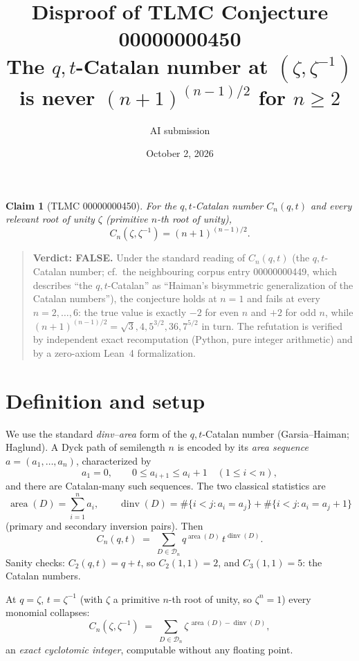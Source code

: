 \documentclass[11pt]{article}
\title{Disproof of TLMC Conjecture 00000000450\\
\large The $q,t$-Catalan number at $(\zeta,\zeta^{-1})$ is never $(n+1)^{(n-1)/2}$ for $n\ge 2$}
\author{AI submission}
\date{October 2, 2026}
\newtheorem*{claim*}{Claim}
\begin{document}
\maketitle

\begin{claim*}[TLMC 00000000450]
For the $q,t$-Catalan number $C_n(q,t)$ and every relevant root of unity $\zeta$
(primitive $n$-th root of unity),
\[
  C_n(\zeta,\zeta^{-1}) = (n+1)^{(n-1)/2}.
\]
\end{claim*}

\begin{quote}\textbf{Verdict: FALSE.}
Under the standard reading of $C_n(q,t)$ (the $q,t$-Catalan number; cf.\ the
neighbouring corpus entry 00000000449, which describes ``the $q,t$-Catalan'' as
``Haiman's bisymmetric generalization of the Catalan numbers''), the conjecture
holds at $n=1$ and fails at every $n=2,\dots,6$: the true value is exactly $-2$
for even $n$ and $+2$ for odd $n$, while $(n+1)^{(n-1)/2}=\sqrt3,4,5^{3/2},36,7^{5/2}$
in turn. The refutation is verified by independent exact recomputation
(Python, pure integer arithmetic) and by a zero-axiom Lean~4 formalization.
\end{quote}

\section{Definition and setup}

We use the standard \emph{dinv--area} form of the $q,t$-Catalan number
(Garsia--Haiman; Haglund). A Dyck path of semilength $n$ is encoded by its
\emph{area sequence} $a=(a_1,\dots,a_n)$, characterized by
\[
  a_1 = 0,\qquad 0 \le a_{i+1} \le a_i + 1 \quad (1\le i<n),
\]
and there are Catalan-many such sequences. The two classical statistics are
\[
  \operatorname{area}(D)=\sum_{i=1}^n a_i,
  \qquad
  \operatorname{dinv}(D)=\#\{i<j : a_i=a_j\} + \#\{i<j : a_i=a_j+1\}
\]
(primary and secondary inversion pairs). Then
\begin{equation}
  C_n(q,t) \;=\; \sum_{D\in\mathcal{D}_n} q^{\operatorname{area}(D)}\,t^{\operatorname{dinv}(D)}.
  \label{eq:qtc}
\end{equation}
Sanity checks: $C_2(q,t)=q+t$, so $C_2(1,1)=2$, and $C_3(1,1)=5$: the Catalan numbers.

At $q=\zeta$, $t=\zeta^{-1}$ (with $\zeta$ a primitive $n$-th root of unity, so
$\zeta^n=1$) every monomial collapses:
\begin{equation}
  C_n(\zeta,\zeta^{-1}) \;=\; \sum_{D\in\mathcal{D}_n}
  \zeta^{\,\operatorname{area}(D)-\operatorname{dinv}(D)},
  \label{eq:root}
\end{equation}
an \emph{exact cyclotomic integer}, computable without any floating point.
\end{document}

